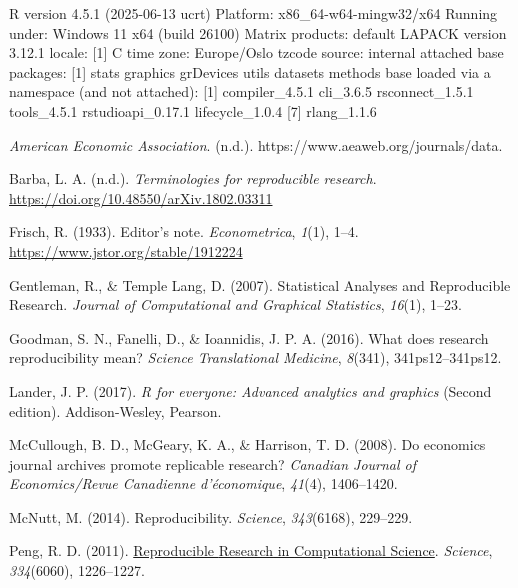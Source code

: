 \documentclass[
  a4paper,
]{article}
\newlength{\cslhangindent}
\newenvironment{CSLReferences}[2] %
 {\begin{list}{}{%
  \setlength{\itemindent}{0pt}
  \setlength{\leftmargin}{0pt}
  \setlength{\parsep}{0pt}
  \ifodd #1
   \setlength{\leftmargin}{\cslhangindent}
   \setlength{\itemindent}{-1\cslhangindent}
  \fi
  \setlength{\itemsep}{#2\baselineskip}}}
 {\end{list}}
\begin{document}
R version 4.5.1 (2025-06-13 ucrt) Platform: x86\_64-w64-mingw32/x64
Running under: Windows 11 x64 (build 26100) Matrix products: default
LAPACK version 3.12.1 locale: {[}1{]} C time zone: Europe/Oslo tzcode
source: internal attached base packages: {[}1{]} stats graphics
grDevices utils datasets methods base loaded via a namespace (and not
attached): {[}1{]} compiler\_4.5.1 cli\_3.6.5 rsconnect\_1.5.1
tools\_4.5.1 rstudioapi\_0.17.1 lifecycle\_1.0.4 {[}7{]} rlang\_1.1.6

\label{refs}
\begin{CSLReferences}{1}{0}
\emph{American {Economic Association}}. (n.d.).
https://www.aeaweb.org/journals/data.

Barba, L. A. (n.d.). \emph{Terminologies for reproducible research}.
\url{https://doi.org/10.48550/arXiv.1802.03311}

Frisch, R. (1933). Editor's note. \emph{Econometrica}, \emph{1}(1),
1--4. \url{https://www.jstor.org/stable/1912224}

Gentleman, R., \& Temple Lang, D. (2007). Statistical {Analyses} and
{Reproducible Research}. \emph{Journal of Computational and Graphical
Statistics}, \emph{16}(1), 1--23.

Goodman, S. N., Fanelli, D., \& Ioannidis, J. P. A. (2016). What does
research reproducibility mean? \emph{Science Translational Medicine},
\emph{8}(341), 341ps12--341ps12.

Lander, J. P. (2017). \emph{R for everyone: Advanced analytics and
graphics} (Second edition). Addison-Wesley, Pearson.

McCullough, B. D., McGeary, K. A., \& Harrison, T. D. (2008). Do
economics journal archives promote replicable research? \emph{Canadian
Journal of Economics/Revue Canadienne d'{é}conomique}, \emph{41}(4),
1406--1420.

McNutt, M. (2014). Reproducibility. \emph{Science}, \emph{343}(6168),
229--229.

Peng, R. D. (2011).
\href{https://www.ncbi.nlm.nih.gov/pubmed/22144613}{Reproducible
{Research} in {Computational Science}}. \emph{Science},
\emph{334}(6060), 1226--1227.


\end{CSLReferences}
\end{document}
